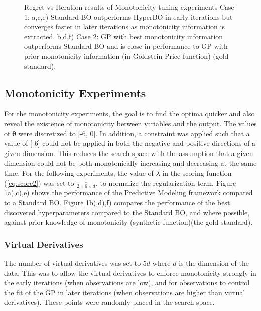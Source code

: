 \documentclass{article}
\begin{document}
\begin{figure}[t]
	\centering
	\qquad
	\qquad
	\qquad
	\qquad
	\qquad
	\caption{Regret vs Iteration results of Monotonicity tuning experiments Case 1: a,c,e) Standard BO outperforms HyperBO in early iterations but converges faster in later iterations as monotonicity information is extracted. b,d,f) Case 2: GP with best monotonicity information outperforms Standard BO and is close in performance to GP with prior monotonicity information (in Goldstein-Price function) (gold standard).}%
	\label{fig:Monotonicity_experiments}%
\end{figure}

\subsection{Monotonicity Experiments}
For the monotonicity experiments, the goal is to find the optima quicker and also reveal the existence of monotonicity between variables and the output. The values of $\boldsymbol{\theta}$ were discretized to [-6, 0]. In addition, a constraint was applied such that a value of [-6] could not be applied in both the negative and positive directions of a given dimension. This reduces the search space with the assumption that a given dimension could not be both monotonically increasing and decreasing at the same time. For the following experiments, the value of $\lambda$ in the scoring function (\ref{eq:score2}) was set to $\frac{1}{2 \times 6 \times d}$, to normalize the regularization term. Figure \ref{fig:Monotonicity_experiments}a),c),e) shows the performance of the Predictive Modeling framework compared to a Standard BO. Figure \ref{fig:Monotonicity_experiments}b),d),f) compares the performance of the best discovered hyperparameters compared to the Standard BO, and where possible, against prior knowledge of monotonicity (synthetic function)(the gold standard).

\subsubsection{Virtual Derivatives}
The number of virtual derivatives was set to $5d$ where $d$ is the dimension of the data. This was to allow the virtual derivatives to enforce monotonicity strongly in the early iterations (when observations are low), and for observations to control the fit of the GP in later iterations (when observations are higher than virtual derivatives). These points were randomly placed in the search space.
\end{document}
